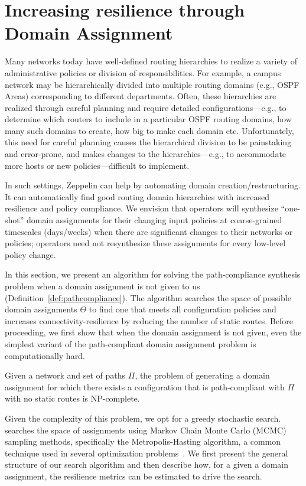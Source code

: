 \section{Increasing resilience through Domain Assignment}
\label{sec:synth-dom-ass}
Many networks today have well-defined routing hierarchies to realize a variety of administrative  policies or division of responsibilities. For example, a campus network may be hierarchically divided into multiple routing domains (e.g., OSPF Areas) corresponding to different departments. Often, these hierarchies are realized through careful planning and require detailed configurations---e.g., to determine which routers to include in a particular OSPF routing domains, how many such domains to create, how big to make each domain etc. Unfortunately, this 
need for careful planning
causes the hierarchical division to be painstaking and error-prone, and makes changes to  the hierarchies---e.g., to accommodate more hosts or new policies---difficult to implement.

In such settings, Zeppelin can help by automating domain creation/restructuring. It can automatically find good routing domain hierarchies with increased resilience and policy compliance. We envision that operators will synthesize “one-shot” domain assignments for their changing input policies at coarse-grained timescales (days/weeks) when there are significant changes to their networks or policies; operators need not resynthesize these assignments for every low-level policy change.


In this section, we present an algorithm for 
solving the path-compliance synthesis problem when a domain assignment is not given to us (Definition~\ref{def:pathcompliance}).
The algorithm searches the space of possible domain assignments $\Theta$ to find
one that meets all configuration policies and increases 
connectivity-resilience by reducing the number of static routes.
Before proceeding, we first show that when the domain assignment is not given,
even the simplest variant of the path-compliant domain assignment problem
is computationally hard.
\begin{theorem}
Given a
network and  set of paths  $\Pi$,
the problem of generating a domain assignment for which
there exists a 
configuration that is path-compliant with $\Pi$ with no static routes
is NP-complete.
\end{theorem}
\iffull

\fi

Given the complexity of this problem, we opt for a greedy
stochastic search.
\name searches the space of assignments using Markov
Chain Monte Carlo (MCMC) sampling methods, specifically the Metropolis-Hasting
algorithm, a common technique used in several optimization 
problems~\cite{stoke}. 
We first present the general structure of our search 
algorithm and 
then describe how, for a given a domain assignment,
the resilience metrics can be
estimated to drive the search.



